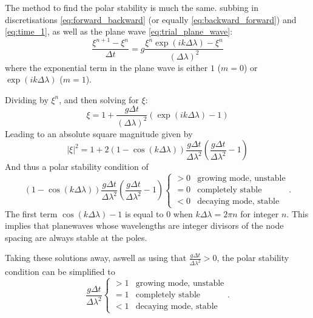 \documentclass[12pt, onecolumn]{revtex4-2}    %
\begin{document}
The method to find the polar stability is much the same.
subbing in discretisations \eqref{eq:forward_backward} (or equally \eqref{eq:backward_forward}) and \eqref{eq:time_1}, as well as the plane wave \eqref{eq:trial_plane_wave}:
\begin{equation*}
    \frac{\xi^{n+1} - \xi^{n}}{\Delta t} = g\frac{\xi^n \exp(i k \Delta\lambda) - \xi^n}{(\Delta\lambda)^2}
\end{equation*}
where the exponential term in the plane wave is either $1$ ($m=0$) or $\exp(i k \Delta\lambda)$ ($m=1$).

Dividing by $\xi^n$, and then solving for $\xi$:
\begin{equation*}
    \xi = 1 + \frac{g\Delta t}{(\Delta \lambda)^2}\left(\exp(i k \Delta \lambda) - 1\right)
\end{equation*}
Leading to an absolute square magnitude given by
\begin{equation*}
    |\xi|^2 = 1 + 2 (1-\cos(k\Delta\lambda)) \frac{g \Delta t}{\Delta \lambda ^2}\left(\frac{g\Delta t}{\Delta \lambda ^2} - 1\right)
\end{equation*}
And thus a polar stability condition of
\begin{equation*}
    (1-\cos(k\Delta\lambda)) \frac{g \Delta t}{\Delta \lambda ^2}\left(\frac{g\Delta t}{\Delta \lambda ^2} - 1\right)
    \begin{cases}
        > 0 & \text{growing mode, unstable} \\
        = 0 & \text{completely stable}      \\
        < 0 & \text{decaying mode, stable}
    \end{cases}
    .
\end{equation*}
The first term $\cos(k\Delta\lambda) - 1$ is equal to $0$ when $k\Delta\lambda = 2\pi n$ for integer $n$.
This implies that planewaves whose wavelengths are integer divisors of the node spacing are always stable at the poles.

Taking these solutions away, aswell as using that $\frac{g \Delta t}{\Delta \lambda ^2} > 0$, the polar stability condition can be simplified to
\begin{equation} \label{appeq:polarstability}
    \frac{g\Delta t}{\Delta \lambda ^2}
    \begin{cases}
        > 1 & \text{growing mode, unstable} \\
        = 1 & \text{completely stable}      \\
        < 1 & \text{decaying mode, stable}
    \end{cases}
    .
\end{equation}
\end{document}
